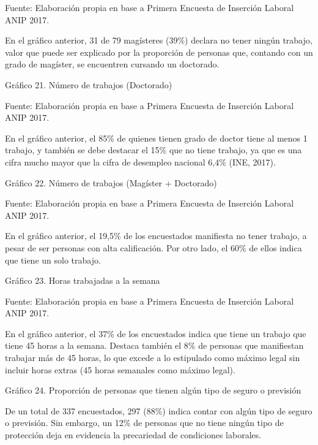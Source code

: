 \documentclass{article}
\begin{document}
Fuente: Elaboración propia en base a Primera Encuesta de Inserción Laboral ANIP 2017.

En el gráfico anterior, 31 de 79 magísteres (39\%) declara no tener ningún trabajo, valor que puede ser explicado por la proporción de personas que, contando con un grado de magíster, se encuentren cursando un doctorado.

Gráfico 21. Número de trabajos (Doctorado)


Fuente: Elaboración propia en base a Primera Encuesta de Inserción Laboral ANIP 2017.

En el gráfico anterior, el 85\% de quienes tienen grado de doctor tiene al menos 1 trabajo, y también se debe destacar el 15\% que no tiene trabajo, ya que es una cifra mucho mayor que la cifra de desempleo nacional 6,4\% (INE, 2017).

Gráfico 22. Número de trabajos (Magíster + Doctorado)


Fuente: Elaboración propia en base a Primera Encuesta de Inserción Laboral ANIP 2017.

En el gráfico anterior, el 19,5\% de los encuestados manifiesta no tener trabajo, a pesar de ser personas con alta calificación. Por otro lado, el 60\% de ellos indica que tiene un solo trabajo.

Gráfico 23. Horas trabajadas a la semana


Fuente: Elaboración propia en base a Primera Encuesta de Inserción Laboral ANIP 2017.

En el gráfico anterior, el 37\% de los encuestados indica que tiene un trabajo que tiene 45 horas a la semana. Destaca también el 8\% de personas que manifiestan trabajar más de 45 horas, lo que excede a lo estipulado como máximo legal sin incluir horas extras (45 horas semanales como máximo legal).

Gráfico 24. Proporción de personas que tienen algún tipo de seguro o previsión


De un total de 337 encuestados, 297 (88\%) indica contar con algún tipo de seguro o previsión. Sin embargo, un 12\% de personas que no tiene ningún tipo de protección deja en evidencia la precariedad de condiciones laborales.
\end{document}
